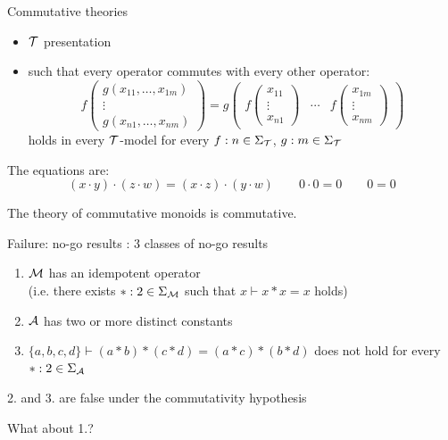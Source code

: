 \documentclass[10pt, english, xcolor={dvipsnames}]{beamer}
\begin{document}
\begin{frame}[t]{Commutative theories}
  \begin{itemize}
    \item $\TT$ presentation
    \item such that every operator commutes with every other operator: $$f \begin{pmatrix}
  g(x_{11}, \dots, x_{1m})\\
  \vdots\\
  g(x_{n1}, \dots, x_{nm})
\end{pmatrix} = g \begin{pmatrix}
  f \begin{pmatrix}
    x_{11}\\
    \vdots\\
    x_{n1}
  \end{pmatrix} & \cdots & f \begin{pmatrix}
    x_{1m}\\
    \vdots\\
    x_{nm}
  \end{pmatrix}
\end{pmatrix}$$ holds in every $\TT$-model for every $f : n \in \Sigma_\TT$, $g : m \in \Sigma_\TT$
  \end{itemize}
  
  \vspace{0.3cm}
  
  The equations are:
  $$(x \cdot y) \cdot (z \cdot w) = (x \cdot z) \cdot (y \cdot w) \qquad 0 \cdot 0 = 0 \qquad 0 = 0$$

  The theory of commutative monoids is commutative.
\end{frame}

\begin{frame}[t]{Failure: no-go results}
  \parencite{nogo_distributive_law}: 3 classes of no-go results
  \begin{enumerate}
    \item $\MM$ has an idempotent operator\\ (i.e. there exists $\ast : 2 \in \Sigma_\MM$ such that $x \vdash x \ast x = x$ holds)
    \item $\AA$ has two or more distinct constants
    \item $\{a, b, c, d\} \vdash (a \ast b) \ast (c \ast d) = (a \ast c) \ast (b \ast d)$ does not hold for every $\ast : 2 \in \Sigma_\AA$ 
  \end{enumerate}
  2. and 3. are false under the commutativity hypothesis

  \vspace{0.3cm}

  What about 1.?
\end{frame}
\end{document}
